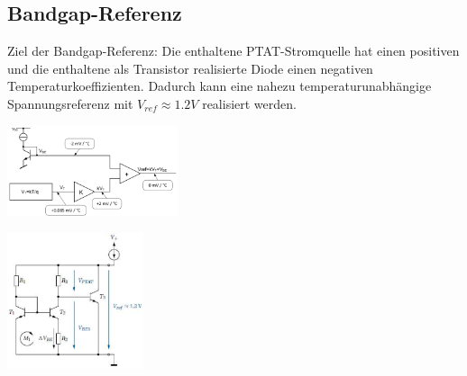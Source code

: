         \subsection{Bandgap-Referenz}
            \begin{minipage}[T]{10cm}
                Ziel der Bandgap-Referenz: Die enthaltene PTAT-Stromquelle hat einen positiven und die enthaltene als Transistor realisierte Diode einen negativen Temperaturkoeffizienten. Dadurch kann eine nahezu temperaturunabh\"angige Spannungsreferenz mit $V_{ref}\approx 1.2V$ realisiert werden.
            \end{minipage}
            \begin{minipage}[T]{5cm}
                \includegraphics[width=5cm]{./bilder/BandgapBlocksch.png}
            \end{minipage}
            \begin{minipage}[T]{4cm}
                \includegraphics[width=4cm]{./bilder/Bandgap.png}
            \end{minipage}






